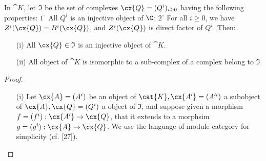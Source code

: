 \begin{lemma}[11.5.2.1]
\label{0.11.5.2.1}
In $\cat{K}$, let $\mathfrak{I}$ be the set of complexes $\cx{Q} = (Q^i)_{i\geq 0}$ having the following properties:
$1^\circ$ All $Q^i$ is an injective object of $\C$;
$2^\circ$ For all $i\geq 0$, we have $Z^i(\cx{Q}) = B^i(\cx{Q})$, and $Z^i({\cx{Q}})$ is direct factor of $Q^i$. Then:
\begin{enumerate}
  \item[(i)] All $\cx{Q}\in \mathfrak{I}$ is an injective object of $\cat{K}$.
  \item[(ii)] All object of $\cat{K}$ is isomorphic to a sub-complex of a complex belong to $\mathfrak{I}$.
\end{enumerate}
\end{lemma}
\begin{proof}
\begin{enumerate}
  \item[(i)] Let $\cx{A}=(A^i)$ be an object of $\cat{K}, \cx{A'} = (A'^i)$ a subobject of $\cx{A}, \cx{Q} = (Q^i)$
  a object of $\mathfrak{I}$, and suppose given a morphism $f = (f^i): \cx{A'}\rightarrow \cx{Q}$, that it extends 
  to a morphsim $g = (g^i): \cx{A}\rightarrow \cx{Q}$. We use the language of module category for simplicity (cf. [27]).


\end{enumerate}
\end{proof}
